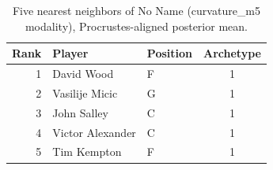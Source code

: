 \begin{table}[htbp]
  \centering\small
  \begin{tabular}{rllc}
    \toprule
    Rank & Player & Position & Archetype \\
    \midrule
    1 & David Wood & F & 1 \\
    2 & Vasilije Micic & G & 1 \\
    3 & John Salley & C & 1 \\
    4 & Victor Alexander & C & 1 \\
    5 & Tim Kempton & F & 1 \\
    \bottomrule
  \end{tabular}
  \caption{Five nearest neighbors of No Name (curvature_m5 modality), Procrustes-aligned posterior mean.}
  \label{tab:No_Name_neighbors_curvature_m5}
\end{table}

